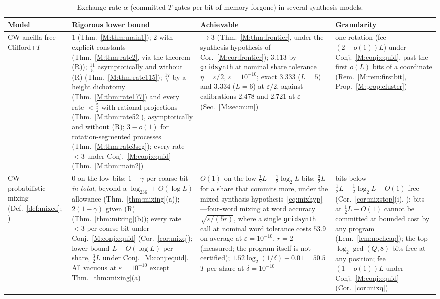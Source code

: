 \documentclass[aps,prx,twocolumn,superscriptaddress,nofootinbib,longbibliography]{revtex4-2}
\theoremstyle{plain}
\theoremstyle{definition}
\theoremstyle{remark}
\begin{document}
\begin{table}[t]
\centering\small
\caption{Exchange rate $\alpha$ (committed $T$ gates per bit of memory forgone) in several synthesis models.}
\label{tab:models}
\begin{tabular}{@{}p{3.6cm} p{5.2cm} p{4.6cm} p{3.4cm}@{}}
\toprule
\raggedright Model & \raggedright Rigorous lower bound & \raggedright Achievable & \raggedright Granularity\tabularnewline
\midrule
\raggedright CW ancilla-free Clifford+$T$ & \raggedright $1$ (Thm.~\ref{M:thm:main1}); $2$ with explicit constants (Thm.~\ref{M:thm:rate2}, via the theorem (R)); $\tfrac{11}5$ asymptotically and without (R) (Thm.~\ref{M:thm:rate115}); $\tfrac{17}7$ by a height dichotomy (Thm.~\ref{M:thm:rate177}) and every rate $<\tfrac52$ with rational projections (Thm.~\ref{M:thm:rate52}), asymptotically and without (R); $3-o(1)$ for rotation-segmented processes (Thm.~\ref{M:thm:rate3seg}); every rate $<3$ under Conj.~\ref{M:conj:equid} (Thm.~\ref{M:thm:main2}) & \raggedright $\to3$ (Thm.~\ref{M:thm:frontier}, under the synthesis hypothesis of Cor.~\ref{M:cor:frontier}); $3.113$ by \texttt{gridsynth} at nominal share tolerance $\eta=\varepsilon/2$, $\varepsilon=10^{-10}$; exact $3.333$ ($L=5$) and $3.334$ ($L=6$) at $\varepsilon/2$, against calibrations $2.478$ and $2.721$ at $\varepsilon$ (Sec.~\ref{M:sec:num}) & \raggedright one rotation (fee $(2-o(1))L$) under Conj.~\ref{M:conj:equid}, past the first $o(L)$ bits of a coordinate (Rem.~\ref{M:rem:firstbit}, Prop.~\ref{M:prop:cluster})\tabularnewline
\raggedright CW $+$ probabilistic mixing (Def.~\ref{def:mixed}; \cite{Campbell17,Hastings17,KLMPP,Bothe}) & \raggedright $0$ on the low bits; $1-\gamma$ per coarse bit \emph{in total}, beyond a $\log_236+O(\log L)$ allowance (Thm.~\ref{thm:mixing}(a)); $2(1-\gamma)$ given (R) (Thm.~\ref{thm:mixing}(b)); every rate $<3$ per coarse bit under Conj.~\ref{M:conj:equid} (Cor.~\ref{cor:mixq}); lower bound $L-O(\log L)$ per share, $\tfrac32L$ under Conj.~\ref{M:conj:equid}. All vacuous at $\varepsilon=10^{-10}$ except Thm.~\ref{thm:mixing}(a) & \raggedright $O(1)$ on the low $\tfrac12L-\tfrac12\log_2L$ bits; $\tfrac32L$ for a share that commits more, under the mixed-synthesis hypothesis~\eqref{eq:mixhyp}---four-word mixing \cite[Thm.~2]{Campbell17} at word accuracy $\sqrt{\varepsilon/(5r)}$, where a single \texttt{gridsynth} call at nominal word tolerance costs $53.9$ on average at $\varepsilon=10^{-10}$, $r=2$ (measured; the program itself is not certified); $1.52\log_2(1/\delta)-0.01=50.5$ $T$ per share at $\delta=10^{-10}$ \cite{KLMPP,Bothe} & \raggedright bits below $\tfrac12L-\tfrac12\log_2L-O(1)$ free (Cor.~\ref{cor:mixstop}(i), \cite{Bothe}); bits at $\tfrac12L-O(1)$ cannot be committed at bounded cost by any program (Lem.~\ref{lem:nocheap}); the top $\log_2\gcd(Q,8)$ bits free at any position; fee $(1-o(1))L$ under Conj.~\ref{M:conj:equid} (Cor.~\ref{cor:mixq})\tabularnewline

\end{tabular}
\end{table}
\end{document}

